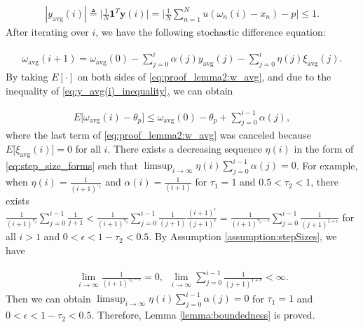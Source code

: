 \documentclass[journal]{IEEEtran}
\begin{document}
\vspace{-4mm}
\small
\begin{align}
|y_{\text{avg}}(i)| \triangleq \bigg| \frac{1}{N}\mathbf{1}^T \mathbf{y}(i)\bigg| = \bigg|\frac{1}{N} \sum_{n=1}^{N} u(\omega_n(i) - x_n) - p \bigg| \le 1. \label{eq:y_avg(i)_inequality}
\end{align}
\normalsize
After {}{iterating over} $i$, we have the following stochastic difference equation:

\vspace{-4mm}
\small
\begin{align}
\omega_{\text{avg}} (i+1) = \omega_{\text{avg}}(0) - \sum_{j=0}^{i}\alpha(j) y_{\text{avg}}(j) - \sum_{j=0}^{i}\eta(j) \xi_{\text{avg}}(j). \label{eq:proof_lemma2:w_avg}
\end{align}
\normalsize
{}{By taking $E\left[\cdot\right]$ on both sides of \eqref{eq:proof_lemma2:w_avg}, and due to the inequality of \eqref{eq:y_avg(i)_inequality}, we can obtain}

\vspace{-4mm}
\small
\begin{align}
E\big[\omega_{\text{avg}}(i) - \theta_p\big] \le \omega_{\text{avg}}(0) - \theta_p + \sum_{j=0}^{i-1} \alpha(j),
\end{align}
\normalsize
{}{where the last term of \eqref{eq:proof_lemma2:w_avg} was canceled because $E\big[\xi_{\text{avg}}(i)\big] = 0$ for all $i$.} There exists a decreasing sequence $\eta(i)$ in the form of \eqref{eq:step_size_forms} such that $\limsup_{i \to \infty} \eta(i) \sum_{j=0}^{i-1}\alpha(j) =0$. For example, when $\eta(i) = \frac{1}{(i+1)^{\tau_2}}$ and $\alpha(i) = \frac{1}{(i+1)}$ for $\tau_1=1$ and $0.5< \tau_2 < 1$, there exists $\frac{1}{(i+1)^{\tau_2}} \sum_{j=0}^{i-1}\frac{1}{j+1} < \frac{1}{(i+1)^{\tau_2}} \sum_{j=0}^{i-1} \frac{1}{(j+1)} \frac{(i+1)^{\epsilon}}{(j+1)^{\epsilon}} = \frac{1}{(i+1)^{\tau_2 - \epsilon}} \sum_{j=0}^{i-1}\frac{1}{(j+1)^{1+\epsilon}}$ for all $i>1$ and $0 < \epsilon < 1 - \tau_2 < 0.5$. By Assumption \ref{assumption:stepSizes}, we have

\vspace{-4mm}
\small
\begin{align}
\lim_{i \to \infty}\frac{1}{(i+1)^{\tau_2 - \epsilon}} = 0,\,\,\,\lim_{i\to\infty} \sum_{j=0}^{i-1}\frac{1}{(j+1)^{1+\epsilon}} < \infty.
\end{align}
\normalsize 
Then we can obtain $\limsup_{i \to \infty} \eta(i) \sum_{j=0}^{i-1} \alpha(j) = 0$ for $\tau_1 = 1$ and $0 < \epsilon < 1 - \tau_2 < 0.5$. Therefore, Lemma {}{\ref{lemma:boundedness} is proved.}
	
\end{document}
